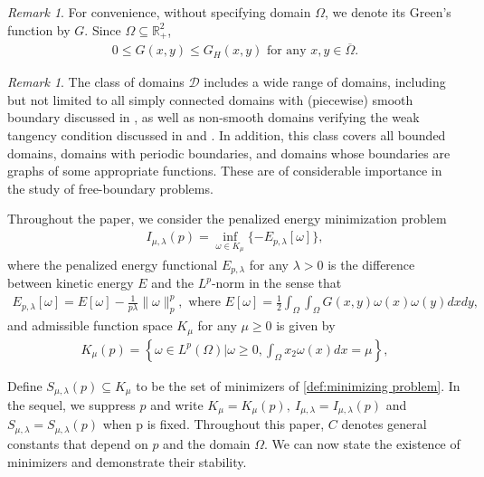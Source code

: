 \documentclass[11pt,letterpaper]{amsart}
\theoremstyle{definition}
\theoremstyle{remark}
\newtheorem{remark}[thm]{Remark}
\newcommand{\D}{\mathcal{D}}
\newcommand{\R}{\mathbb{R}}
\renewcommand{\O}{\Omega}
\renewcommand{\tt}[1]{\text{#1}}
\numberwithin{equation}{section}
\begin{document}
\begin{remark}
    For convenience, without specifying domain $\O$, we denote its Green’s function by $G$. Since $\O \subseteq \R^2_+$,
    \begin{align}
        0\leq G(x,y)\leq G_H(x,y) \tt{ for any } x,y\in \overline{\Omega}.\label{ineq:comparison between green's function}
    \end{align}
\end{remark}
\begin{remark}
    The class of domains $\D$ includes a wide range of domains, including but not limited to all simply connected domains with (piecewise) smooth boundary discussed in \cite{lacave2019euler}, as well as non-smooth domains verifying the weak tangency condition discussed in \cite{gerard2013two} and \cite{galdi2011introduction}. In addition, this class covers all bounded domains, domains with periodic boundaries, and domains whose boundaries are graphs of some appropriate functions. These are of considerable importance in the study of free-boundary problems. 
\end{remark}


Throughout the paper, we consider the penalized energy minimization problem
\begin{align}
    I_{\mu,\lambda}(p)=\inf_{\omega \in K_{\mu}}\{-E_{p,\lambda}[\omega]\}, \label{def:minimizing problem}
\end{align}
where the penalized energy functional $E_{p,\lambda}$ for any $\lambda>0$ is the difference between kinetic energy $E$ and the $L^p$-norm in the sense that 
\begin{align*}
    E_{p,\lambda}[\omega]=E[\omega]-\frac{1}{p\lambda}\|\omega\|_{p}^p, \tt{ where } E[\omega]=\frac{1}{2}\int_{\Omega}\int_{\Omega}G(x,y)\omega(x)\omega(y)dxdy, 
\end{align*}
and admissible function space $K_{\mu}$ for any $\mu \geq 0$ is given by 
\begin{align*}
    K_{\mu}(p)=\left\{\omega\in L^p(\Omega) \big| \omega\geq0, \int_{\Omega}x_2\omega(x)dx=\mu \right\}, 
\end{align*}

Define $S_{\mu,\lambda}(p)\subseteq K_{\mu}$ to be the set of minimizers of \eqref{def:minimizing problem}. In the sequel, we suppress $p$ and write $K_{\mu}=K_{\mu}(p), \ I_{\mu,\lambda} = I_{\mu,\lambda}(p)$ and $S_{\mu,\lambda} = S_{\mu,\lambda}(p)$ when p is fixed.
Throughout this paper, $C$ denotes general constants that depend on $p$ and the domain $\Omega$. We can now state the existence of minimizers and demonstrate their stability.
\end{document}
